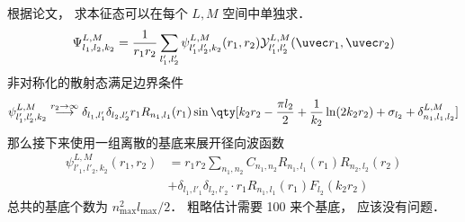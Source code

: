 
根据论文， 求本征态可以在每个 $L,M$ 空间中单独求．
\begin{equation}
\Psi_{l_1,l_2,k_2}^{L,M} = \frac{1}{r_1 r_2}\sum_{l'_1, l'_2}  \psi_{l'_1, l'_2, k_2}^{L, M}(r_1, r_2)\mathcal{Y}_{l'_1, l'_2}^{L, M}(\uvec r_1, \uvec r_2)
\end{equation}
非对称化的散射态满足边界条件
\begin{equation}
\psi_{l'_1,l'_2,k_2}^{L, M} \overset{r_2\to\infty}{\longrightarrow} \delta_{l_1,l'_1}\delta_{l_2,l'_2} r_1 R_{n_1,l_1}(r_1)
\sin\qty[k_2 r_2 - \frac{\pi l_2}{2} +\frac{1}{k_2}\ln(2k_2 r_2) + \sigma_{l_2} + \delta_{n_1,l_1,l_2}^{L,M}]
\end{equation}
那么接下来使用一组离散的基底来展开径向波函数
\begin{equation}
\begin{aligned}
\psi_{l'_1, l'_2,k_2}^{L, M}(r_1, r_2) &= r_1r_2\sum_{n_1,n_2} C_{n_1,n_2} R_{n_1,l_1}(r_1) R_{n_2,l_2}(r_2)\\
& +\delta_{l_1,l'_1}\delta_{l_2,l'_2} \cdot r_1 R_{n_1,l_1}(r_1) F_{l_2}(k_2 r_2)
\end{aligned}
\end{equation}
总共的基底个数为 $n_\text{max}^2 l_\text{max}/2$． 粗略估计需要 100 来个基底， 应该没有问题．
